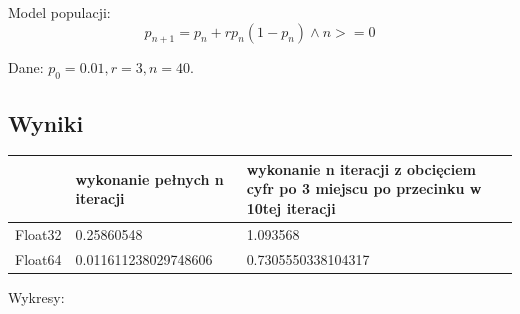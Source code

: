 \documentclass[11pt, a4paper]{article}
\begin{document}
Model populacji:
\[p_{n+1} = p_{n} + rp_{n}(1 - p_{n}) \land n >= 0\]

Dane: $p_{0} = 0.01, r = 3, n = 40$.
\subsection{Wyniki}
\begin{center}
  \begin{tabular}{l|l|p{8cm}}
    & wykonanie pełnych n iteracji & wykonanie n iteracji z obcięciem cyfr po 3 miejscu po przecinku w 10tej iteracji\\
    \hline
    Float32 & 0.25860548 & 1.093568\\
    Float64 & 0.011611238029748606 & 0.7305550338104317
  \end{tabular}
\end{center}
Wykresy:
\end{document}
